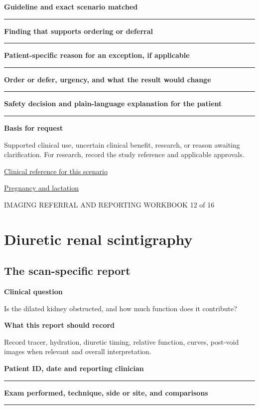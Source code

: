 \documentclass[11pt,a4paper]{article}
\newcommand{\record}[1]{\textbf{#1}\par\vspace{0.55\baselineskip}\hrule\vspace{0.35\baselineskip}}
\begin{document}
\record{Guideline and exact scenario matched}

\record{Finding that supports ordering or deferral}

\record{Patient-specific reason for an exception, if applicable}

\record{Order or defer, urgency, and what the result would change}

\record{Safety decision and plain-language explanation for the patient}

\textbf{Basis for request}\par Supported clinical use, uncertain clinical benefit, research, or reason awaiting clarification. For research, record the study reference and applicable approvals.\par

\small\href{https://snmmi.org/Web/Web/Clinical-Practice/Procedure-Standards/Standards/Diuretic-Renal-Scintigraphy-in-Adults-With-Suspected-Upper-Urinary-Tract-Obstruction-1-0.aspx}{Clinical reference for this scenario}

\quad\href{https://pubmed.ncbi.nlm.nih.gov/28937575/}{Pregnancy and lactation}

\normalsize

\newpage

{\small IMAGING REFERRAL AND REPORTING WORKBOOK \hfill 12 of 16}

\section*{Diuretic renal scintigraphy}

\subsection*{The scan-specific report}

\textbf{Clinical question}\par Is the dilated kidney obstructed, and how much function does it contribute?\par

\textbf{What this report should record}\par Record tracer, hydration, diuretic timing, relative function, curves, post-void images when relevant and overall interpretation.\par

\record{Patient ID, date and reporting clinician}

\record{Exam performed, technique, side or site, and comparisons}
\end{document}
